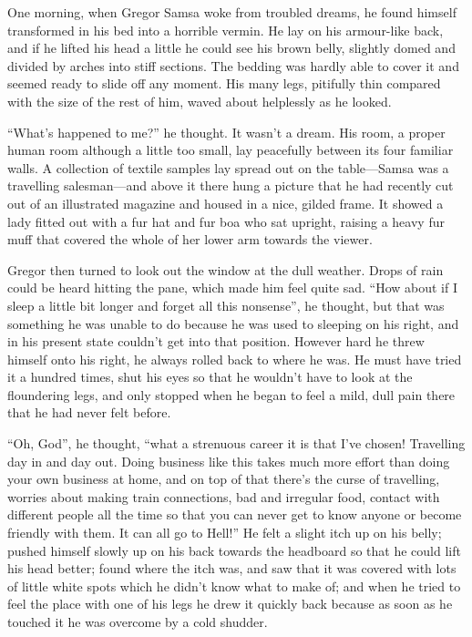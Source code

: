 One morning, when Gregor Samsa woke from troubled dreams, he found
himself transformed in his bed into a horrible vermin. He lay on his
armour-like back, and if he lifted his head a little he could see his
brown belly, slightly domed and divided by arches into stiff sections.
The bedding was hardly able to cover it and seemed ready to slide off
any moment. His many legs, pitifully thin compared with the size of the
rest of him, waved about helplessly as he looked.

“What’s happened to me?” he thought. It wasn’t a dream. His room, a
proper human room although a little too small, lay peacefully between
its four familiar walls. A collection of textile samples lay spread out
on the table—Samsa was a travelling salesman—and above it there hung a
picture that he had recently cut out of an illustrated magazine and
housed in a nice, gilded frame. It showed a lady fitted out with a fur
hat and fur boa who sat upright, raising a heavy fur muff that covered
the whole of her lower arm towards the viewer.

Gregor then turned to look out the window at the dull weather. Drops of
rain could be heard hitting the pane, which made him feel quite sad.
“How about if I sleep a little bit longer and forget all this
nonsense”, he thought, but that was something he was unable to do
because he was used to sleeping on his right, and in his present state
couldn’t get into that position. However hard he threw himself onto his
right, he always rolled back to where he was. He must have tried it a
hundred times, shut his eyes so that he wouldn’t have to look at the
floundering legs, and only stopped when he began to feel a mild, dull
pain there that he had never felt before.

“Oh, God”, he thought, “what a strenuous career it is that I’ve chosen!
Travelling day in and day out. Doing business like this takes much more
effort than doing your own business at home, and on top of that there’s
the curse of travelling, worries about making train connections, bad
and irregular food, contact with different people all the time so that
you can never get to know anyone or become friendly with them. It can
all go to Hell!” He felt a slight itch up on his belly; pushed himself
slowly up on his back towards the headboard so that he could lift his
head better; found where the itch was, and saw that it was covered with
lots of little white spots which he didn’t know what to make of; and
when he tried to feel the place with one of his legs he drew it quickly
back because as soon as he touched it he was overcome by a cold
shudder.

